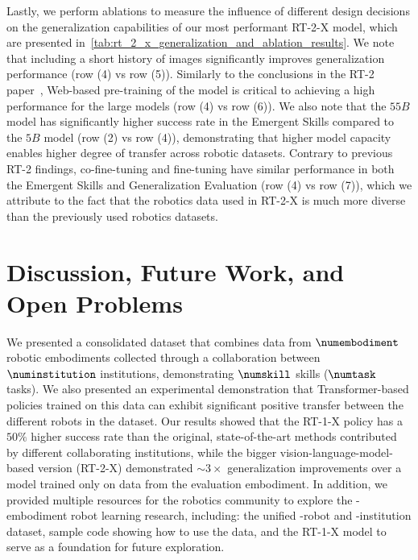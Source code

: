 Lastly, we perform ablations to measure the influence of different design decisions on the generalization capabilities of our most performant RT-2-X model, which are presented in~\cref{tab:rt_2_x_generalization_and_ablation_results}.
We note that including a short history of images significantly improves generalization performance (row (4) vs row (5)). 
Similarly to the conclusions in the RT-2 paper~\cite{brohan2023rt2}, Web-based pre-training of the model is critical to achieving a high performance for the large models (row (4) vs row (6)).
We also note that the $55B$ model has significantly higher success rate in the Emergent Skills compared to the $5B$ model (row (2) vs row (4)), demonstrating that higher model capacity enables higher degree of transfer across robotic datasets. Contrary to previous RT-2 findings, co-fine-tuning and fine-tuning have similar performance in both the Emergent Skills and Generalization Evaluation (row (4) vs row (7)), which we attribute to the fact that the robotics data used in RT-2-X is much more diverse than the previously used robotics datasets. 

\vspace{-0.3em}
\section{Discussion, Future Work, and Open Problems}
\vspace{-0.3em}
\label{sec:conclusions}

We presented a consolidated dataset that combines data from $\numembodiment$ robotic embodiments collected through a collaboration between $\numinstitution$ institutions, demonstrating $\numskill$ skills ($\numtask$ tasks). We also presented an experimental demonstration that Transformer-based policies trained on this data can exhibit significant positive transfer between the different robots in the dataset. Our results showed that the RT-1-X policy has a $50\%$ higher success rate than the original, state-of-the-art methods contributed by different collaborating institutions, while the bigger vision-language-model-based version (RT-2-X) demonstrated $\sim3\times$ generalization improvements over a model trained only on data from the evaluation embodiment. In addition, we provided multiple resources for the robotics community to explore the \cro-embodiment robot learning research, including: the unified \cro-robot and \cro-institution dataset, sample code showing how to use the data, and the RT-1-X model to serve as a foundation for future exploration. 

